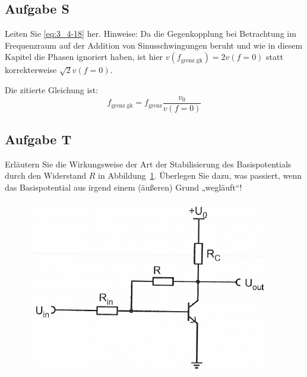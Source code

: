 \fehlt

\FloatBarrier
\subsection{Aufgabe S}

\begin{problem}
	Leiten Sie \eqref{eq:3_4-18} her. Hinweise: Da die Gegenkopplung bei
	Betrachtung im Frequenzraum auf der Addition von Sinusschwingungen beruht
	und wie in diesem Kapitel die Phasen ignoriert haben, ist hier
	$v(f_\text{grenz gk}) = 2v(f=0)$ statt korrekterweise $\sqrt 2 v (f = 0)$.
\end{problem}

Die zitierte Gleichung ist:
\begin{equation}
	\label{eq:3_4-18}
	f_\text{grenz gk} = f_\text{grenz} \frac{v_0}{v(f=0)}
\end{equation}

\fehlt

\FloatBarrier
\subsection{Aufgabe T}

\begin{problem}
	Erläutern Sie die Wirkungsweise der Art der Stabilisierung des
	Basispotentials durch den Widerstand $R$ in Abbildung~\ref{fig:3_4-16}.
	Überlegen Sie dazu, was passiert, wenn das Basispotential aus irgend einem
	(äußeren) Grund „wegläuft“!
\end{problem}

\begin{figure}[htbp]
	\centering
	\includegraphics[width=.6\textwidth]{Anleitung/3_4-16.png}
	\caption{%
		\cite[Abbildung~3/4.16]{physik313-Anleitung}
	}
	\label{fig:3_4-16}
\end{figure}

\fehlt


